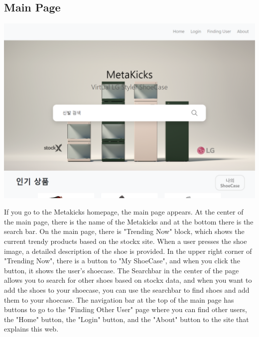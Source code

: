 \documentclass[conference]{IEEEtran}
\begin{document}
\subsection{Main Page}
\centerline{\includegraphics[scale=0.3]{pics/main_page.png}}
If you go to the Metakicks homepage, the main page appears. At the center of the main page, there is the name of  the Metakicks and at the bottom there is the search bar. On the main page, there is "Trending Now" block, which shows the current trendy products based on the stockx site. When a user presses the shoe image, a detailed description of the shoe is provided. In the upper right corner of "Trending Now", there is a button to "My ShoeCase", and when you click the button, it shows the user's shoecase. The Searchbar in the center of the page allows you to search for other shoes based on stockx data, and when you want to add the shoes to your shoecase, you can use the searchbar to find shoes and add them to your shoecase. The navigation bar at the top of the main page has buttons to go to the "Finding Other User" page where you can find other users, the "Home" button, the "Login" button, and the "About" button to the site that explains this web.\\
\end{document}
